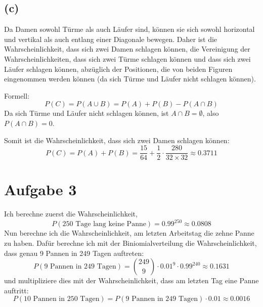 \documentclass[a4paper]{scrartcl}
\begin{document}
\subsection*{(c)}
Da Damen sowohl Türme als auch Läufer sind, können sie sich sowohl horizontal und vertikal als auch entlang einer Diagonale bewegen. Daher ist die Wahrscheinlichkeit, dass sich zwei Damen schlagen können, die Vereinigung der Wahrscheinlichkeiten, dass sich zwei Türme schlagen können und dass sich zwei Läufer schlagen können, abzüglich der Positionen, die von beiden Figuren eingenommen werden können (da sich Türme und Läufer nicht schlagen können).

Formell:
\[
  P(C) = P(A \cup B) = P(A) + P(B) - P(A \cap B)
\]
Da sich Türme und Läufer nicht schlagen können, ist \( A \cap B = \emptyset \), also \( P(A \cap B) = 0 \).

Somit ist die Wahrscheinlichkeit, dass sich zwei Damen schlagen können:
\[
  P(C) = P(A) + P(B) = \frac{15}{64} + \frac{1}{2} \cdot \frac{280}{32 \times 32} \approx 0.3711
\]

\section*{Aufgabe 3}
Ich berechne zuerst die Wahrscheinlichkeit,\\
\[
  P(\text{250 Tage lang keine Panne}) = 0.99^{250} \approx 0.0808
\]
Nun berechne ich die Wahrscheinlichkeit, am letzten Arbeitstag die zehne Panne zu haben.
Dafür berechne ich mit der Biniomialverteilung die Wahrscheinlichkeit, dass genau 9 Pannen in 249 Tagen auftreten:
\[
  P(\text{9 Pannen in 249 Tagen}) = \binom{249}{9} \cdot 0.01^9 \cdot 0.99^{240} \approx 0.1631
\]
und multipliziere dies mit der Wahrscheinlichkeit, dass am letzten Tag eine Panne auftritt:
\[
  P(\text{10 Pannen in 250 Tagen}) = P(\text{9 Pannen in 249 Tagen}) \cdot 0.01 \approx 0.0016
\]
\end{document}

